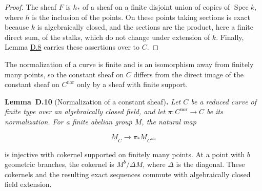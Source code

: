 \documentclass[11pt]{article}
\newenvironment{bpstatement}[2]{\par\addvspace{0.6\baselineskip}\noindent\textbf{#1}#2\textbf{.}\enspace\ignorespaces}
  {\par\addvspace{0.4\baselineskip}}
\newenvironment{bpstatementit}[2]{\begin{bpstatement}{#1}{#2}\itshape\ignorespaces}{\end{bpstatement}}
\begin{document}
\begin{proof}[{Proof}]\label{bp203}%
The sheaf \(F\) is \(h_*\) of a sheaf on a finite disjoint union of copies of \(\operatorname{Spec}k\), where \(h\) is the inclusion of the points. On these points taking sections is exact because \(k\) is algebraically closed, and the sections are the product, here a finite direct sum, of the stalks, which do not change under extension of \(k\). Finally, Lemma \hyperref[bp199]{D.8} carries these assertions over to \(C\).
\end{proof}

\label{bp204}%
The normalization of a curve is finite and is an isomorphism away from finitely many points, so the constant sheaf on \(C\) differs from the direct image of the constant sheaf on \(C^{\mathrm{nor}}\) only by a sheaf with finite support.

\label{bp205}%
\begin{bpstatementit}{Lemma~D.10}{ (Normalization of a constant sheaf)}
Let \(C\) be a reduced curve of finite type over an algebraically closed field, and let \(\pi:C^{\mathrm{nor}}\to C\) be its normalization.  For a finite abelian group \(M\), the natural map

\[
\underline M_C\longrightarrow \pi_*\underline M_{C^{\mathrm{nor}}}
\]

is injective with cokernel supported on finitely many points.  At a point with \(b\) geometric branches, the cokernel is \(M^b/\Delta M\), where \(\Delta\) is the diagonal. These cokernels and the resulting exact sequences commute with algebraically closed field extension.
\end{bpstatementit}
\end{document}
